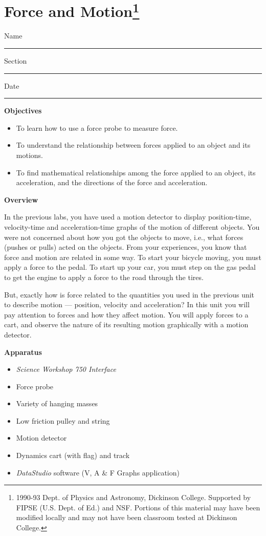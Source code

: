 
\section{Force and Motion\footnote{
1990-93 Dept. of Physics and Astronomy, Dickinson College. Supported by FIPSE
(U.S. Dept. of Ed.) and NSF. Portions of this material may have been modified
locally and may not have been classroom tested at Dickinson College.
}}

Name \rule{2.0in}{0.1pt}\hfill{}Section \rule{1.0in}{0.1pt}\hfill{}Date \rule{1.0in}{0.1pt}

\textbf{Objectives }

\begin{itemize}
\item To learn how to use a force probe to measure force. 
\item To understand the relationship between forces applied to an object and its motions. 
\item To find mathematical relationships among the force applied to an object, its acceleration, and the directions of the force and acceleration.
\end{itemize}

\textbf{Overview }

In the previous labs, you have used a motion detector to display position-time,
velocity-time and acceleration-time graphs of the motion of different objects.
You were not concerned about how you got the objects to move, i.e., what forces
(pushes or pulls) acted on the objects. From your experiences, you know that
force and motion are related in some way. To start your bicycle moving, you
must apply a force to the pedal. To start up your car, you must step on the
gas pedal to get the engine to apply a force to the road through the tires.

But, exactly how is force related to the quantities you used in the previous
unit to describe motion --- position, velocity and acceleration? In this unit you
will pay attention to forces and how they affect motion. You will apply forces
to a cart, and observe the nature of its resulting motion graphically with a
motion detector.


\textbf{Apparatus} 

\begin{itemize}
\item \textit{Science Workshop 750 Interface}
\item Force probe 
\item Variety of hanging masses 
\item Low friction pulley and string 
\item Motion detector 
\item Dynamics cart (with flag) and track 
\item \textit{DataStudio} software (V, A \& F Graphs application)
\end{itemize}

